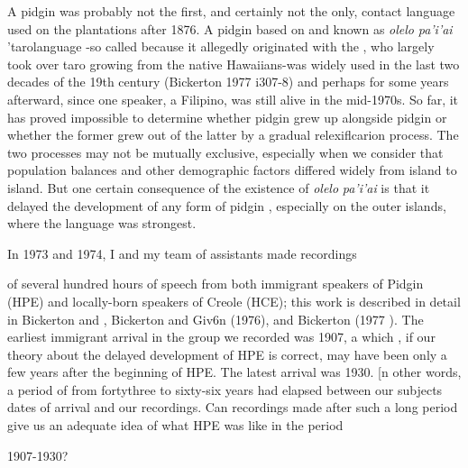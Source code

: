 A pidgin  was probably not the first, and certainly not the only, contact language used on the  plantations after 1876. A pidgin based on  and known as \textit{olelo} \textit{pa'i'ai }'taro\-language {}-so called because it allegedly originated with the , who largely took over taro growing from the native Hawaiians-was widely used in the last two decades of the 19th century (Bickerton 1977 i307-8) and perhaps for some years afterward, since one speaker, a Filipino, was still alive in the mid-1970s. So far, it has proved impos\-sible to determine whether pidgin  grew up alongside pidgin  or whether the former grew out of the latter by a gradual relexiflcarion process. The two processes may not be mutually exclu\-sive, especially when we consider that population balances and other demographic factors differed widely from island to island. But one certain consequence of the existence of \textit{olelo} \textit{pa'i'ai} is that it delayed the development of any form of pidgin , especially on the outer islands, where the  language was strongest.

In 1973 and 1974, I and my team of assistants made recordings


of several hundred hours of speech from both immigrant speakers of  Pidgin  (HPE) and locally-born speakers of  Creole  (HCE); this work is described in detail in Bickerton and \citet{Odo1976}, Bickerton and Giv6n (1976), and Bickerton (1977 ). The earliest immigrant arrival in the group we recorded was 1907, a  which , if our theory about the delayed development of HPE is correct, may have been only a few years after the beginning of HPE. The latest arrival was 1930. [n other words, a period of from forty\-three to sixty-six years had elapsed between our subjects dates of arrival and our recordings. Can recordings made after such a long period give us an adequate idea of what HPE was like in the period

1907-1930?

